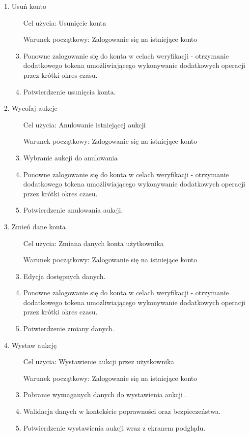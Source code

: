 \documentclass[10pt,titlepage]{article} %
\begin{document}
\begin{enumerate}[1.]
\item Usuń konto
\begin{enumerate}
\item[Cel użycia:] Usunięcie konta
\item[Warunek początkowy:] Zalogowanie się na istniejące konto
\item Ponowne zalogowanie się do konta w celach weryfikacji - otrzymanie dodatkowego tokena umożliwiającego wykonywanie dodatkowych operacji przez krótki okres czasu.
\item Potwierdzenie usunięcia konta.
\end{enumerate}

\item Wycofaj aukcje
\begin{enumerate}
\item[Cel użycia:] Anulowanie istniejącej aukcji
\item[Warunek początkowy:] Zalogowanie się na istniejące konto
\item Wybranie aukcji do anulowania
\item Ponowne zalogowanie się do konta w celach weryfikacji - otrzymanie dodatkowego tokena umożliwiającego wykonywanie dodatkowych operacji przez krótki okres czasu.
\item Potwierdzenie anulowania aukcji.
\end{enumerate}

\item Zmień dane konta
\begin{enumerate}
\item[Cel użycia:] Zmiana danych konta użytkownika
\item[Warunek początkowy:] Zalogowanie się na istniejące konto
\item Edycja dostępnych danych.
\item Ponowne zalogowanie się do konta w celach weryfikacji - otrzymanie dodatkowego tokena umożliwiającego wykonywanie dodatkowych operacji przez krótki okres czasu.
\item Potwierdzenie zmiany danych.
\end{enumerate}

\item Wystaw aukcję
\begin{enumerate}
\item[Cel użycia:] Wystawienie aukcji przez użytkownika
\item[Warunek początkowy:] Zalogowanie się na istniejące konto
\item Pobranie wymaganych danych do wystawienia aukcji .
\item Walidacja danych w kontekście poprawności oraz bezpieczeństwa.
\item Potwierdzenie wystawienia aukcji wraz z ekranem podglądu.
\end{enumerate}


\end{enumerate}
\end{document}
